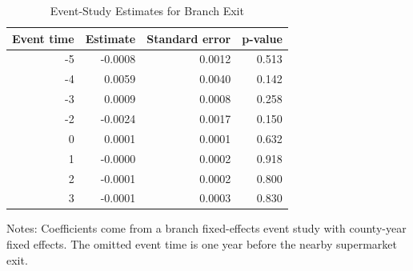 \begin{table}[H]
\centering
\caption{Event-Study Estimates for Branch Exit}
\begin{threeparttable}
\begin{tabular}{rrrr}
\toprule
Event time & Estimate & Standard error & p-value \\
\midrule
-5 & -0.0008 & 0.0012 & 0.513 \\
-4 & 0.0059 & 0.0040 & 0.142 \\
-3 & 0.0009 & 0.0008 & 0.258 \\
-2 & -0.0024 & 0.0017 & 0.150 \\
0 & 0.0001 & 0.0001 & 0.632 \\
1 & -0.0000 & 0.0002 & 0.918 \\
2 & -0.0001 & 0.0002 & 0.800 \\
3 & -0.0001 & 0.0003 & 0.830 \\
\bottomrule
\end{tabular}
\begin{tablenotes}[flushleft]
\small
\item Notes: Coefficients come from a branch fixed-effects event study with county-year fixed effects. The omitted event time is one year before the nearby supermarket exit.
\end{tablenotes}
\end{threeparttable}
\label{tab:event_exit}
\end{table}
